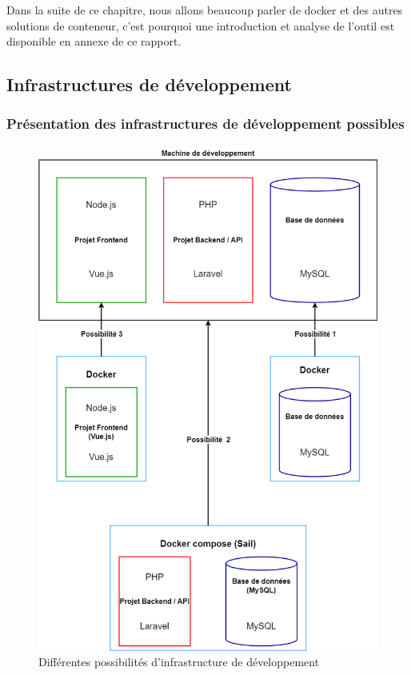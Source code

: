 \documentclass[
    iai, %
    il, %
]{heig-tb}
\begin{document}
Dans la suite de ce chapitre, nous allons beaucoup parler de \Gls{docker} et des autres solutions de \Gls{conteneur}, c'est pourquoi une introduction et analyse de l'outil est disponible en annexe de ce rapport.

\subsection{Infrastructures de développement}

\subsubsection{Présentation des infrastructures de développement possibles}

\begin{center}
    \begin{figure}[H]
        \includegraphics[width=\textwidth]{./assets/figures/infrastructure-dev-choix.drawio.png}
        \caption{Différentes possibilités d'infrastructure de développement \label{infrastructure-dev-choix.drawio}}
    \end{figure}
\end{center}
\end{document}
